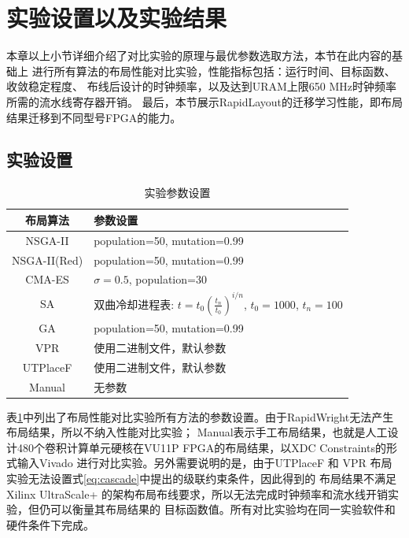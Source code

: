 \section{实验设置以及实验结果}

本章以上小节详细介绍了对比实验的原理与最优参数选取方法，本节在此内容的基础上
进行所有算法的布局性能对比实验，性能指标包括：运行时间、目标函数、收敛稳定程度、
布线后设计的时钟频率，以及达到URAM上限650 MHz时钟频率所需的流水线寄存器开销。
最后，本节展示RapidLayout的迁移学习性能，即布局结果迁移到不同型号FPGA的能力。

\subsection{实验设置}

\begin{table}[h]
	\centering
	\caption{实验参数设置}		
	\label{tab:param}
	\begin{tabular}{c|l}
		\toprule[2pt]
		布局算法 	& 参数设置	\\
        \midrule[2pt]                                         
        NSGA-II	&  population=50, mutation=0.99\\
        \hline
        NSGA-II(Red)  & population=50, mutation=0.99  \\
        \hline
        CMA-ES &  $\sigma=0.5$, population=30\\
        \hline
        SA & 双曲冷却进程表: $t = t_0 (\frac{t_n}{t_0})^{i/n}$, $t_0=1000$, $t_n=100$\\
        \hline
        GA & population=50, mutation=0.99 \\
        \hline
        VPR & 使用二进制文件，默认参数\\
        \hline
        UTPlaceF & 使用二进制文件，默认参数\\
        \hline
        Manual & 无参数\\
        \bottomrule[2pt]
	\end{tabular}
\end{table}

表\ref{tab:param}中列出了布局性能对比实验所有方法的参数设置。由于RapidWright无法产生布局结果，所以不纳入性能对比实验；
Manual表示手工布局结果，也就是人工设计480个卷积计算单元硬核在VU11P FPGA的布局结果，以XDC Constraints的形式输入Vivado
进行对比实验。另外需要说明的是，由于UTPlaceF 和 VPR 布局实验无法设置式\ref{eq:cascade}中提出的级联约束条件，因此得到的
布局结果不满足Xilinx UltraScale+ 的架构布局布线要求，所以无法完成时钟频率和流水线开销实验，但仍可以衡量其布局结果的
目标函数值。所有对比实验均在同一实验软件和硬件条件下完成。


